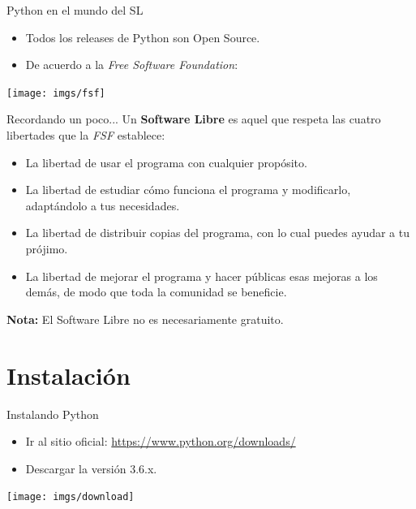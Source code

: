 \documentclass[usenames,dvipsnames]{beamer}
\begin{document}
  \begin{frame}{Python en el mundo del SL}
    \begin{itemize}
      \item Todos los releases de Python son Open Source.
      \item De acuerdo a la \textit{Free Software Foundation}:
    \end{itemize}
    \begin{center}
      \begin{tcolorbox}[beamer,
                  width=1.065\textheight,
                  arc=0pt,
                  boxsep=0pt,
                  left=0pt,right=0pt,top=0pt,bottom=0pt,
                  ]
        \texttt{[image: imgs/fsf]}
      \end{tcolorbox}
    \end{center}
  \end{frame}

  \begin{frame}{Recordando un poco...}
    Un \textbf{Software Libre} es aquel que respeta las cuatro libertades que
    la \textit{FSF} establece:
    \begin{itemize}
      \item La libertad de usar el programa con cualquier propósito.
      \item La libertad de estudiar cómo funciona el programa y modificarlo,
      adaptándolo a tus necesidades.
      \item La libertad de distribuir copias del programa, con lo cual puedes
      ayudar a tu prójimo.
      \item La libertad de mejorar el programa y hacer públicas esas mejoras a
      los demás, de modo que toda la comunidad se beneficie.
    \end{itemize}
    \textbf{Nota:} El Software Libre no es necesariamente gratuito.
  \end{frame}

  \section{Instalación}
  \begin{frame}{Instalando Python}
    \begin{itemize}
      \item Ir al sitio oficial: {\color{RoyalBlue} \url{https://www.python.org/downloads/}}
      \item Descargar la versión 3.6.x.
    \end{itemize}
    \begin{center}
      \begin{tcolorbox}[beamer,
                  width=1.065\textheight,
                  arc=0pt,
                  boxsep=0pt,
                  left=0pt,right=0pt,top=0pt,bottom=0pt,
                  ]
        \texttt{[image: imgs/download]}
      \end{tcolorbox}
    \end{center}
  \end{frame}
\end{document}
